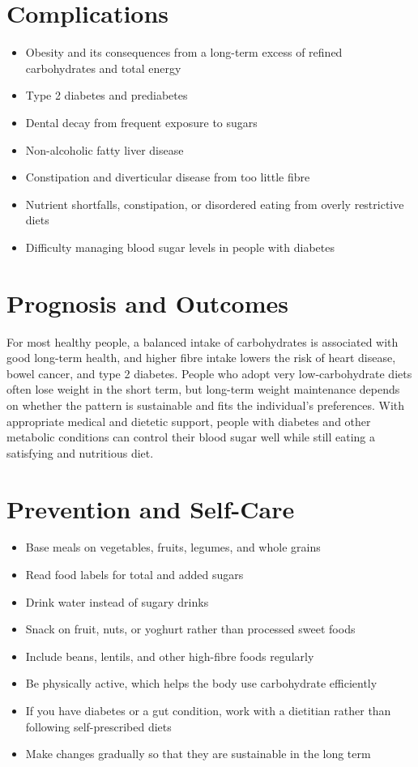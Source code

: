 \section*{Complications}
\begin{itemize}
    \item Obesity and its consequences from a long-term excess of refined carbohydrates and total energy
    \item Type 2 diabetes and prediabetes
    \item Dental decay from frequent exposure to sugars
    \item Non-alcoholic fatty liver disease
    \item Constipation and diverticular disease from too little fibre
    \item Nutrient shortfalls, constipation, or disordered eating from overly restrictive diets
    \item Difficulty managing blood sugar levels in people with diabetes
\end{itemize}

\section*{Prognosis and Outcomes}
For most healthy people, a balanced intake of carbohydrates is associated with good long-term health, and higher fibre intake lowers the risk of heart disease, bowel cancer, and type 2 diabetes. People who adopt very low-carbohydrate diets often lose weight in the short term, but long-term weight maintenance depends on whether the pattern is sustainable and fits the individual's preferences. With appropriate medical and dietetic support, people with diabetes and other metabolic conditions can control their blood sugar well while still eating a satisfying and nutritious diet.

\section*{Prevention and Self-Care}
\begin{itemize}
    \item Base meals on vegetables, fruits, legumes, and whole grains
    \item Read food labels for total and added sugars
    \item Drink water instead of sugary drinks
    \item Snack on fruit, nuts, or yoghurt rather than processed sweet foods
    \item Include beans, lentils, and other high-fibre foods regularly
    \item Be physically active, which helps the body use carbohydrate efficiently
    \item If you have diabetes or a gut condition, work with a dietitian rather than following self-prescribed diets
    \item Make changes gradually so that they are sustainable in the long term
\end{itemize}

